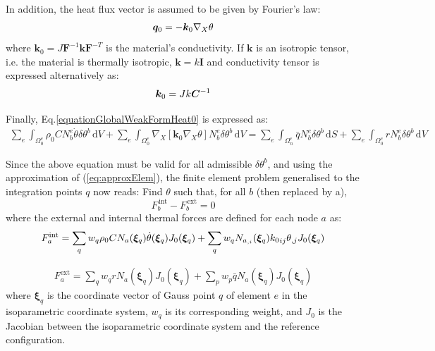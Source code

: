 \documentclass[oneside,11pt,times]{book}
\begin{document}
In addition, the heat flux vector is assumed to be given by Fourier's law:
\begin{equation}
\centering
\bm{q}_0=-\bm{k}_0\nabla_{X}\theta
\label{Fourier}
\end{equation}
where $\bm{k}_0=J\bm{F}^{-1}\bm{k}\bm{F}^{-T}$ is the material's conductivity. If $\bm{k}$ is an isotropic tensor, i.e. the material is thermally isotropic, $\bm{k}=k\bm{I}$ and conductivity tensor is expressed alternatively as:
\begin{equation}
\begin{aligned}
\centering
\centering
\bm{k}_0=Jk\bm{C}^{-1}
\end{aligned}
\label{equationqmat}
\end{equation}

Finally, Eq.\eqref{equationGlobalWeakFormHeat0} is expressed as:
\begin{equation} \label{equationGlobalWeakFormHeat}
 \begin{split}
 \sum_e \int_{\Omega_{0}^e} \rho_0C N^e_b\dot{\theta}\delta\theta^b\, \text{d} V +\sum_e \int_{\Omega_{0}^e}{\nabla_{X}}\left[\bm{k}_0\nabla_{X}\theta\right] N^e_b\delta\theta^b\, \text{d} V=\sum_e \int_{\Omega_{n}^e} \bar{q} N^e_b\delta\theta^b \, \text{d} S+ \sum_e\int_{\Omega_{0}^e}rN^e_b\delta\theta^b\, \text{d} V
 \end{split}
\end{equation}


Since the above equation must be valid for all admissible $ \delta\theta^b$, and using the approximation of (\ref{eq:approxElem}), the finite element problem generalised to the integration points $q$ now reads: Find ${\theta}$ such that, for all $b$ (then replaced by a),
%
\begin{equation} \label{equationResTheta}
{F}_{b}^{\,\text{int}} -  {F}_{b}^{\,\text{ext}} = 0
\end{equation}
%
where the external and internal thermal forces are defined for each node $a$ as:\\

\begin{equation}
\begin{aligned}
\centering
{F}^{\text{int}}_a=\sum_q w_q\rho_0C N_a(\bm{\xi}_q)\dot{\theta}(\bm{\xi}_q)J_0(\bm{\xi}_q)+\sum_q w_q N_{a_{,i}}(\bm{\xi}_q){k_0}_{ij}\theta_{,j}J_0(\bm{\xi}_q)
\end{aligned}
\label{equationFintElemTheta}
\end{equation}

\begin{equation}
\begin{split}
{F}^{\text{ext}}_a=\sum_q w_q r N_a(\bm{\xi}_q)J_0(\bm{\xi}_q)+\sum_p w_p\bar{q} N_a(\bm{\xi}_q)J_0(\bm{\xi}_q)
\end{split}
\label{equationFextElemTheta}
\end{equation}
%
where $\bm{\xi}_q$ is the coordinate vector of Gauss point $q$ of element $e$ in the isoparametric coordinate system, $w_q$ is its corresponding weight, and $J_0$ is the Jacobian between the isoparametric coordinate system and the reference configuration.
\end{document}
